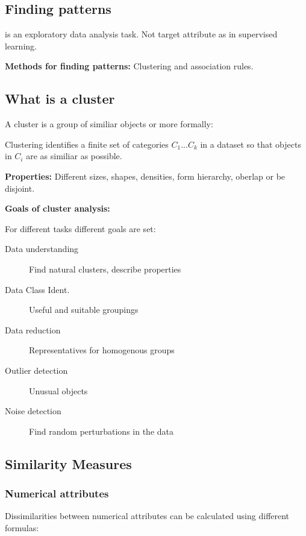 \documentclass[fleqn, oneside, 10pt, titlepage]{article}
\newenvironment{shadedSmallerPadding}{
  \def\FrameCommand{\fboxsep=0.3cm \colorbox{MyBoxColor}}
  \MakeFramed {\advance\hsize-1.1\width\FrameRestore}}
{\endMakeFramed}
\begin{document}
\subsection{Finding patterns}
is an exploratory data analysis task. Not target attribute as in supervised learning. 

\textbf{Methods for finding patterns:} Clustering and association rules.

\subsection{What is a cluster}
A cluster is a group of similiar objects or more formally:

\begin{shadedSmallerPadding}
	Clustering identifies a finite set of categories $C_1 ... C_k$ in a dataset so that objects in $C_i$ are as similiar as possible.
	
	\textbf{Properties:} Different sizes, shapes, densities, form hierarchy, oberlap or be disjoint.
\end{shadedSmallerPadding}

\textbf{Goals of cluster analysis:}

For different tasks different goals are set:

\begin{description}
	\item[Data understanding] Find natural clusters, describe properties
	\item[Data Class Ident.] Useful and suitable groupings
	\item[Data reduction] Representatives for homogenous groups
	\item[Outlier detection] Unusual objects
	\item[Noise detection] Find random perturbations in the data
\end{description}

\subsection{Similarity Measures}
\subsubsection{Numerical attributes}
Dissimilarities between numerical attributes can be calculated using different formulas:
\end{document}
